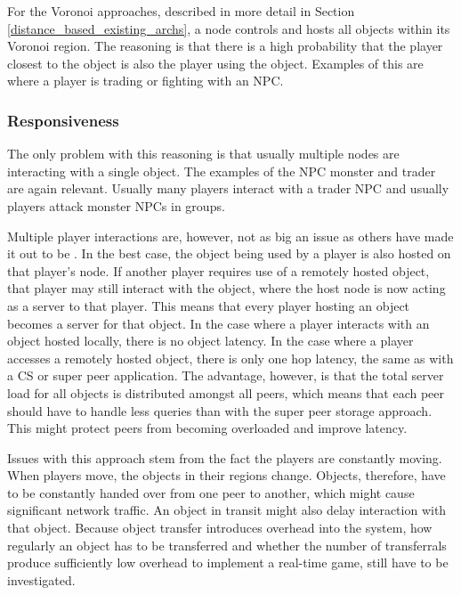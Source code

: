 \documentclass[10pt,a4paper,journal,cspaper,compsoc]{IEEEtran}
\begin{document}
For the Voronoi approaches, described in more detail in Section \ref{distance_based_existing_archs}, a node controls and hosts all objects within its
Voronoi region. The reasoning is that there is a high probability that the player closest to the object is also the player using the object. Examples
of this are where a player is trading or fighting with an NPC.

\subsubsection{Responsiveness}

The only problem with this reasoning is that usually multiple nodes are interacting with a single object. The examples of the NPC monster and trader
are again relevant. Usually many players interact with a trader NPC and usually players attack monster NPCs in groups.

Multiple player interactions are, however, not as big an issue as others have made it out to be \cite{Fan_deisgn_issues_p2p}. In the best case, the
object being used by a player is also hosted on that player's node. If another player requires use of a remotely hosted object, that player may still
interact with the object, where the host node is now acting as a server to that player. This means that every player hosting an object becomes a
server for that object. In the case where a player interacts with an object hosted locally, there is no object latency. In the case where a player
accesses a remotely hosted object, there is only one hop latency, the same as with a \ac{CS} or super peer application. The advantage, however, is
that the total server load for all objects is distributed amongst all peers, which means that each peer should have to handle less queries than with
the super peer storage approach. This might protect peers from becoming overloaded and improve latency.

Issues with this approach stem from the fact the players are constantly moving. When players move, the objects in their regions change. Objects,
therefore, have to be constantly handed over from one peer to another, which might cause significant network traffic. An object in transit might also
delay interaction with that object. Because object transfer introduces overhead into the system, how regularly an object has to be transferred and
whether the number of transferrals produce sufficiently low overhead to implement a real-time game, still have to be investigated.
\end{document}
